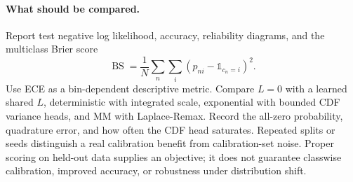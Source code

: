 \documentclass[letterpaper]{article}
\newcommand{\ind}{\mathbb 1}
\begin{document}
\paragraph{What should be compared.}
Report test negative log likelihood, accuracy, reliability diagrams, and the multiclass Brier score
\begin{equation*}
\operatorname{BS}=\frac1N\sum_n\sum_i(p_{ni}-\ind_{c_n=i})^2.
\end{equation*}
Use ECE as a bin-dependent descriptive metric. Compare $L=0$ with a learned shared $L$, deterministic with integrated scale, exponential with bounded CDF variance heads, and MM with Laplace-Remax. Record the all-zero probability, quadrature error, and how often the CDF head saturates. Repeated splits or seeds distinguish a real calibration benefit from calibration-set noise. Proper scoring on held-out data supplies an objective; it does not guarantee classwise calibration, improved accuracy, or robustness under distribution shift.

\clearpage
\end{document}
